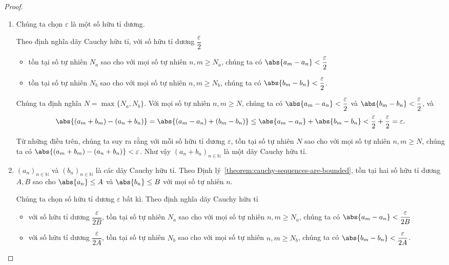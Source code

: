 \begin{proof}
    \begin{enumerate}[label={(\roman*)}]
        \item Chúng ta chọn $\varepsilon$ là một số hữu tỉ dương.

              Theo định nghĩa dãy Cauchy hữu tỉ, với số hữu tỉ dương $\dfrac{\varepsilon}{2}$
              \begin{itemize}
                  \item tồn tại số tự nhiên $N_{a}$ sao cho với mọi số tự nhiên $n, m\geq N_{a}$, chúng ta có $\abs{a_{m} - a_{n}} < \dfrac{\varepsilon}{2}$
                  \item tồn tại số tự nhiên $N_{b}$ sao cho với mọi số tự nhiên $n, m\geq N_{b}$, chúng ta có $\abs{b_{m} - b_{n}} < \dfrac{\varepsilon}{2}$.
              \end{itemize}

              Chúng ta định nghĩa $N = \max\{ N_{a}, N_{b} \}$. Với mọi số tự nhiên $n, m\geq N$, chúng ta có $\abs{a_{m} - a_{n}} < \dfrac{\varepsilon}{2}$ và $\abs{b_{m} - b_{n}} < \dfrac{\varepsilon}{2}$, và
              \[
                  \abs{(a_{m} + b_{m}) - (a_{n} + b_{n})} = \abs{(a_{m} - a_{n}) + (b_{m} - b_{n})} \leq \abs{a_{m} - a_{n}} + \abs{b_{m} - b_{n}} < \frac{\varepsilon}{2} + \frac{\varepsilon}{2} = \varepsilon.
              \]

              Từ những điều trên, chúng ta suy ra rằng với mỗi số hữu tỉ dương $\varepsilon$, tồn tại số tự nhiên $N$ sao cho với mọi số tự nhiên $n, m\geq N$, chúng ta có $\abs{(a_{m} + b_{m}) - (a_{n} + b_{n})} < \varepsilon$. Như vậy ${(a_{n} + b_{n})}_{n\in\mathbb{N}}$ là một dãy Cauchy hữu tỉ.
        \item ${(a_{n})}_{n\in\mathbb{N}}$ và ${(b_{n})}_{n\in\mathbb{N}}$ là các dãy Cauchy hữu tỉ. Theo Định lý~\ref{theorem:cauchy-sequences-are-bounded}, tồn tại hai số hữu tỉ dương $A, B$ sao cho $\abs{a_{n}}\leq A$ và $\abs{b_{n}}\leq B$ với mọi số tự nhiên $n$.

              Chúng ta chọn số hữu tỉ dương $\varepsilon$ bất kì. Theo định nghĩa dãy Cauchy hữu tỉ
              \begin{itemize}
                  \item với số hữu tỉ dương $\dfrac{\varepsilon}{2B}$, tồn tại số tự nhiên $N_{a}$ sao cho với mọi số tự nhiên $n, m\geq N_{a}$, chúng ta có $\abs{a_{m} - a_{n}} < \dfrac{\varepsilon}{2B}$
                  \item với số hữu tỉ dương $\dfrac{\varepsilon}{2A}$, tồn tại số tự nhiên $N_{b}$ sao cho với mọi số tự nhiên $n, m\geq N_{b}$, chúng ta có $\abs{b_{m} - b_{n}} < \dfrac{\varepsilon}{2A}$.
              \end{itemize}


\end{enumerate}
\end{proof}
